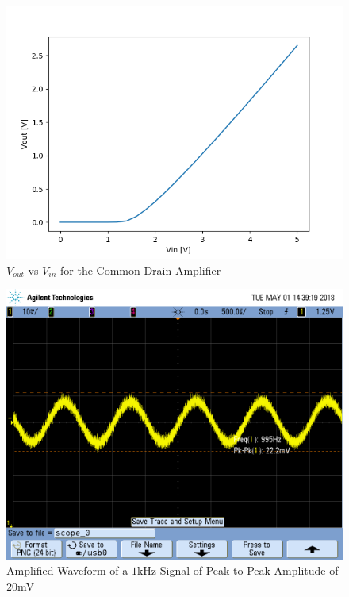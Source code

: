 \FloatBarrier

\begin{figure}[h!]
	\centering
	\includegraphics[scale=0.45]{./images/part1_vtc.PNG}
	\caption{$V_{out}$ vs $V_{in}$ for the Common-Drain Amplifier}
	\label{fig:part1_vtc}
\end{figure}

\FloatBarrier

\FloatBarrier

\begin{figure}[h!]
	\centering
	\includegraphics[scale=0.45]{./images/SCOPE_0.PNG}
	\caption{Amplified Waveform of a $1$\si{\kilo\hertz} Signal of Peak-to-Peak Amplitude of $20$\si{\milli\volt}}
	\label{fig:SCOPE_0}
\end{figure}

